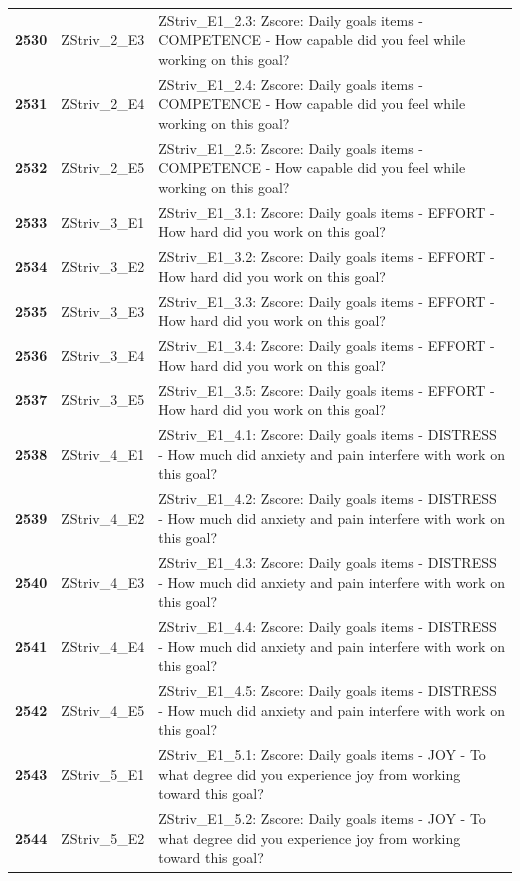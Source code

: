 \documentclass[
  letterpaper,
  DIV=11,
  numbers=noendperiod]{scrartcl}
\begin{document}
\begin{longtable}[t]{>{}cll}
\textbf{2530} & ZStriv\_2\_E3 & ZStriv\_E1\_2.3: Zscore:  Daily goals items - COMPETENCE - How capable did you feel while working on this goal?\\
\addlinespace
\textbf{2531} & ZStriv\_2\_E4 & ZStriv\_E1\_2.4: Zscore:  Daily goals items - COMPETENCE - How capable did you feel while working on this goal?\\
\textbf{2532} & ZStriv\_2\_E5 & ZStriv\_E1\_2.5: Zscore:  Daily goals items - COMPETENCE - How capable did you feel while working on this goal?\\
\textbf{2533} & ZStriv\_3\_E1 & ZStriv\_E1\_3.1: Zscore:  Daily goals items - EFFORT - How hard did you work on this goal?\\
\textbf{2534} & ZStriv\_3\_E2 & ZStriv\_E1\_3.2: Zscore:  Daily goals items - EFFORT - How hard did you work on this goal?\\
\textbf{2535} & ZStriv\_3\_E3 & ZStriv\_E1\_3.3: Zscore:  Daily goals items - EFFORT - How hard did you work on this goal?\\
\addlinespace
\textbf{2536} & ZStriv\_3\_E4 & ZStriv\_E1\_3.4: Zscore:  Daily goals items - EFFORT - How hard did you work on this goal?\\
\textbf{2537} & ZStriv\_3\_E5 & ZStriv\_E1\_3.5: Zscore:  Daily goals items - EFFORT - How hard did you work on this goal?\\
\textbf{2538} & ZStriv\_4\_E1 & ZStriv\_E1\_4.1: Zscore:  Daily goals items - DISTRESS - How much did anxiety and pain interfere with work on this goal?\\
\textbf{2539} & ZStriv\_4\_E2 & ZStriv\_E1\_4.2: Zscore:  Daily goals items - DISTRESS - How much did anxiety and pain interfere with work on this goal?\\
\textbf{2540} & ZStriv\_4\_E3 & ZStriv\_E1\_4.3: Zscore:  Daily goals items - DISTRESS - How much did anxiety and pain interfere with work on this goal?\\
\addlinespace
\textbf{2541} & ZStriv\_4\_E4 & ZStriv\_E1\_4.4: Zscore:  Daily goals items - DISTRESS - How much did anxiety and pain interfere with work on this goal?\\
\textbf{2542} & ZStriv\_4\_E5 & ZStriv\_E1\_4.5: Zscore:  Daily goals items - DISTRESS - How much did anxiety and pain interfere with work on this goal?\\
\textbf{2543} & ZStriv\_5\_E1 & ZStriv\_E1\_5.1: Zscore:  Daily goals items - JOY - To what degree did you experience joy from working toward this goal?\\
\textbf{2544} & ZStriv\_5\_E2 & ZStriv\_E1\_5.2: Zscore:  Daily goals items - JOY - To what degree did you experience joy from working toward this goal?\\

\end{longtable}
\end{document}
